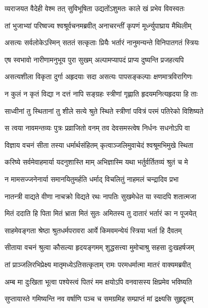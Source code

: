 \twolineshloka
{व्यराजयत वैदेही वेश्म तत् सुविभूषिता}
{उद्यतोंऽशुमतः काले खं प्रभेव विवस्वतः} %

\twolineshloka
{तां भुजाभ्यां परिष्वज्य श्वश्रूर्वचनमब्रवीत्}
{अनाचरन्तीं कृपणं मूर्ध्न्युपाघ्राय मैथिलीम्} %

\twolineshloka
{असत्यः सर्वलोकेऽस्मिन् सततं सत्कृताः प्रियैः}
{भर्तारं नानुमन्यन्ते विनिपातगतं स्त्रियः} %

\twolineshloka
{एष स्वभावो नारीणामनुभूय पुरा सुखम्}
{अल्पामप्यापदं प्राप्य दुष्यन्ति प्रजहत्यपि} %

\twolineshloka
{असत्यशीला विकृता दुर्गा अहृदयाः सदा}
{असत्यः पापसङ्कल्पाः क्षणमात्रविरागिणः} %

\twolineshloka
{न कुलं न कृतं विद्या न दत्तं नापि सङ्ग्रहः}
{स्त्रीणां गृह्णाति हृदयमनित्यहृदया हि ताः} %

\twolineshloka
{साध्वीनां तु स्थितानां तु शीले सत्ये श्रुते स्थिते}
{स्त्रीणां पवित्रं परमं पतिरेको विशिष्यते} %

\twolineshloka
{स त्वया नावमन्तव्यः पुत्रः प्रव्राजितो वनम्}
{तव देवसमस्त्वेष निर्धनः सधनोऽपि वा} %

\twolineshloka
{विज्ञाय वचनं सीता तस्या धर्मार्थसंहितम्}
{कृत्वाञ्जलिमुवाचेदं श्वश्रूमभिमुखे स्थिता} %

\twolineshloka
{करिष्ये सर्वमेवाहमार्या यदनुशास्ति माम्}
{अभिज्ञास्मि यथा भर्तुर्वर्तितव्यं श्रुतं च मे} %

\twolineshloka
{न मामसज्जनेनार्या समानयितुमर्हति}
{धर्माद् विचलितुं नाहमलं चन्द्रादिव प्रभा} %

\twolineshloka
{नातन्त्री वाद्यते वीणा नाचक्रो विद्यते रथः}
{नापतिः सुखमेधेत या स्यादपि शतात्मजा} %

\twolineshloka
{मितं ददाति हि पिता मितं भ्राता मितं सुतः}
{अमितस्य तु दातारं भर्तारं का न पूजयेत्} %

\twolineshloka
{साहमेवङ्गता श्रेष्ठा श्रुतधर्मपरावरा}
{आर्ये किमवमन्येयं स्त्रिया भर्ता हि दैवतम्} %

\twolineshloka
{सीताया वचनं श्रुत्वा कौसल्या हृदयङ्गमम्}
{शुद्धसत्त्वा मुमोचाश्रु सहसा दुःखहर्षजम्} %

\twolineshloka
{तां प्राञ्जलिरभिप्रेक्ष्य मातृमध्येऽतिसत्कृताम्}
{रामः परमधर्मात्मा मातरं वाक्यमब्रवीत्} %

\twolineshloka
{अम्ब मा दुःखिता भूत्वा पश्येस्त्वं पितरं मम}
{क्षयोऽपि वनवासस्य क्षिप्रमेव भविष्यति} %

\twolineshloka
{सुप्तायास्ते गमिष्यन्ति नव वर्षाणि पञ्च च}
{समग्रमिह सम्प्राप्तं मां द्रक्ष्यसि सुहृद्वृतम्} %

